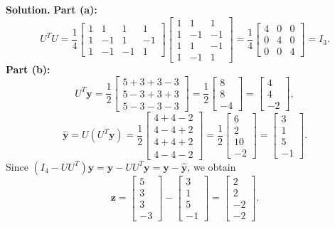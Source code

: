 \documentclass[11pt, letterpaper]{article}
\theoremstyle{definition}
\theoremstyle{remark}
\begin{document}
\textbf{Solution.}
\textbf{Part (a):}
\[
U^T U = \frac{1}{4}\begin{bmatrix} 1 & 1 & 1 & 1 \\ 1 & -1 & 1 & -1 \\ 1 & -1 & -1 & 1 \end{bmatrix}\begin{bmatrix} 1 & 1 & 1 \\ 1 & -1 & -1 \\ 1 & 1 & -1 \\ 1 & -1 & 1 \end{bmatrix} = \frac{1}{4}\begin{bmatrix} 4 & 0 & 0 \\ 0 & 4 & 0 \\ 0 & 0 & 4 \end{bmatrix} = I_3.
\]
\textbf{Part (b):}
\[
U^T \mathbf{y} = \frac{1}{2}\begin{bmatrix} 5 + 3 + 3 - 3 \\ 5 - 3 + 3 + 3 \\ 5 - 3 - 3 - 3 \end{bmatrix} = \frac{1}{2}\begin{bmatrix} 8 \\ 8 \\ -4 \end{bmatrix} = \begin{bmatrix} 4 \\ 4 \\ -2 \end{bmatrix},
\]
\[
\hat{\mathbf{y}} = U(U^T \mathbf{y}) = \frac{1}{2}\begin{bmatrix} 4 + 4 - 2 \\ 4 - 4 + 2 \\ 4 + 4 + 2 \\ 4 - 4 - 2 \end{bmatrix} = \frac{1}{2}\begin{bmatrix} 6 \\ 2 \\ 10 \\ -2 \end{bmatrix} = \begin{bmatrix} 3 \\ 1 \\ 5 \\ -1 \end{bmatrix}.
\]
Since $(I_4 - UU^T)\mathbf{y} = \mathbf{y} - UU^T\mathbf{y} = \mathbf{y} - \hat{\mathbf{y}}$, we obtain
\[
\mathbf{z} = \begin{bmatrix} 5 \\ 3 \\ 3 \\ -3 \end{bmatrix} - \begin{bmatrix} 3 \\ 1 \\ 5 \\ -1 \end{bmatrix} = \begin{bmatrix} 2 \\ 2 \\ -2 \\ -2 \end{bmatrix}.
\]
\end{document}
